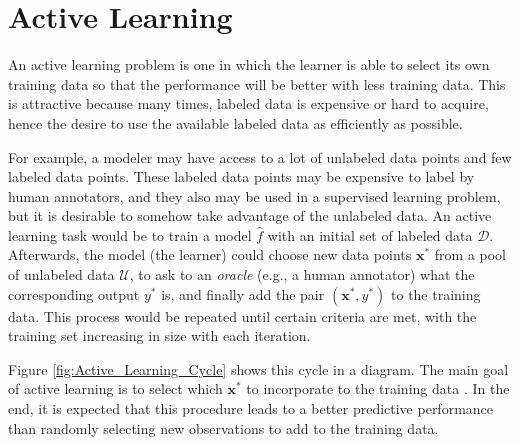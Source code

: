 
\chapter{Active Learning}
\label{ch:active_learning}



An active learning problem is one in which the learner is able to select its own training data so that the performance will be better with less training data. This is attractive because many times, labeled data is expensive or hard to acquire, hence the desire to use the available labeled data as efficiently as possible.

For example, a modeler may have access to a lot of unlabeled data points and few labeled data points. These labeled data points may be expensive to label by human annotators, and they also may be used in a supervised learning problem, but it is desirable to somehow take advantage of the unlabeled data. An active learning task would be to train a model $\hat{f}$ with an initial set of labeled data $\mathcal{D}$. Afterwards, the model (the learner) could choose new data points $\boldsymbol{x}^*$ from a pool of unlabeled data $\mathcal{U}$, to ask to an \textit{oracle} (e.g., a human annotator) what the corresponding output $y^*$ is, and finally add the pair $(\boldsymbol{x}^*, {y}^*)$ to the training data. This process would be repeated until certain criteria are met, with the training set increasing in size with each iteration.

Figure \ref{fig:Active_Learning_Cycle} shows this cycle in a diagram. The main goal of active learning is to select which $\boldsymbol{x}^*$ to incorporate to the training data \cite{cohn1996active}. In the end, it is expected that this procedure leads to a better predictive performance than randomly selecting new observations to add to the training data.

